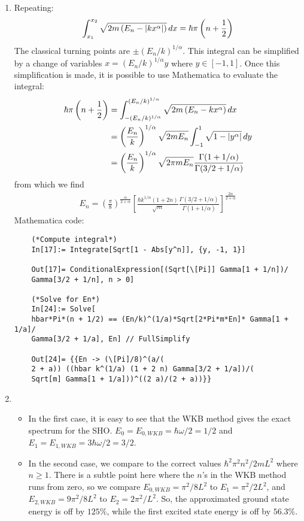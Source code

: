 \documentclass{article}
\theoremstyle{definition}
\newcommand{\al}{\alpha}
\newcommand{\f}[2]{\frac{#1}{#2}}
\newcommand{\lp}{\left(}
\newcommand{\rp}{\right)}
\newcommand{\lb}{\left[}
\newcommand{\rb}{\right]}
\begin{document}
\begin{enumerate}[label=(\alph*)]
	\item Repeating:
	\begin{align*}
	\int_{x_1}^{x_2} \sqrt{2m\lp E_n - \abs{kx^\al} \rp}\,dx = \hbar \pi \lp n + \f{1}{2} \rp
	\end{align*}
	The classical turning points are $\pm (E_n/k)^{1/\al}$. This integral can be simplified by a change of variables $x = (E_n/k)^{1/\al} y$ where $y \in [-1,1]$. Once this simplification is made, it is possible to use Mathematica to evaluate the integral:
	\begin{align*}
	\hbar \pi \lp n + \f{1}{2} \rp 
	&= \int_{-(E_n/k)^{1/\al}}^{(E_n/k)^{1/\al}} \sqrt{2m\lp E_n - kx^\al \rp}\,dx\\ 
	&= \lp \f{E_n}{k} \rp^{1/\al}\sqrt{2mE_n}\int^{1}_{-1} \sqrt{1- \abs{y^\al}}\,dy\\  
	&= {\lp \f{E_n}{k} \rp^{1/\al}\sqrt{2\pi mE_n}  \f{\Gamma(1+1/\al)}{\Gamma(3/2+1/\al)}}
	\end{align*}
	from which we find
	\begin{align*}
	\boxed{E_n = \lp\f{\pi}{8}\rp^{\f{\al}{2+\al}} \lb  \f{\hbar k^{1/\al}(1+2n)}{\sqrt{m}}  \f{\Gamma(3/2+1/\al)}{\Gamma(1+1/\al)}\rb^{\f{2\al}{2+\al}}}
	\end{align*}
	Mathematica code:
	\begin{lstlisting}
	(*Compute integral*)
	In[17]:= Integrate[Sqrt[1 - Abs[y^n]], {y, -1, 1}]
	
	Out[17]= ConditionalExpression[(Sqrt[\[Pi]] Gamma[1 + 1/n])/
	Gamma[3/2 + 1/n], n > 0]
	
	(*Solve for En*)
	In[24]:= Solve[
	hbar*Pi*(n + 1/2) == (En/k)^(1/a)*Sqrt[2*Pi*m*En]* Gamma[1 + 1/a]/
	Gamma[3/2 + 1/a], En] // FullSimplify
	
	Out[24]= {{En -> (\[Pi]/8)^(a/(
	2 + a)) ((hbar k^(1/a) (1 + 2 n) Gamma[3/2 + 1/a])/(
	Sqrt[m] Gamma[1 + 1/a]))^((2 a)/(2 + a))}}
	\end{lstlisting}
	
	
	\item 
	\begin{itemize}
		\item In the first case, it is easy to see that the WKB method gives the exact spectrum for the SHO. $E_0 = E_{0,WKB}= \hbar \omega/2 = \boxed{1/2}$ and $E_1 =E_{1,WKB} = 3\hbar\omega/2 = \boxed{3/2}$. 
		
		\item In the second case, we compare to the correct values $\hbar^2 \pi^2 n^2/2mL^2$ where $n \geq 1$. There is a subtle point here where the $n$'s in the WKB method runs from zero, so we compare $E_{0,WKB} = \boxed{\pi^2/8L^2}$ to  $E_1 = \pi^2/2L^2$, and $E_{2,WKB} = \boxed{9\pi^2/8L^2} $ to $E_2 = 2\pi^2/L^2$. So, the approximated ground state energy is off by $125\%$, while the first excited state energy is off by $56.3\%$.
		

\end{itemize}
\end{enumerate}
\end{document}
